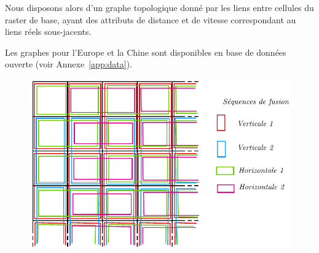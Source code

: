 Nous disposons alors d'un graphe topologique donné par les liens entre cellules du raster de base, ayant des attributs de distance et de vitesse correspondant au liens réels sous-jacents.


Les graphes pour l'Europe et la Chine sont disponibles en base de données ouverte (voir Annexe~\ref{app:data}).




\begin{figure}[h!]
\begin{mdframed}

	\includegraphics[width=\linewidth]{Figures/Theory/nwsimplification.pdf}

	\medskip

\end{mdframed}
\end{figure}










